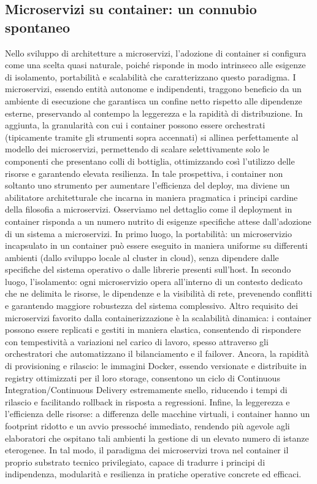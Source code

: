 \subsection{Microservizi su container: un connubio spontaneo}
Nello sviluppo di architetture a microservizi, l’adozione di container si configura come una scelta quasi naturale, poiché risponde in modo intrinseco alle esigenze di isolamento, portabilità e scalabilità che caratterizzano questo paradigma. I microservizi, essendo entità autonome e indipendenti, traggono beneficio da un ambiente di esecuzione che garantisca un confine netto rispetto alle dipendenze esterne, preservando al contempo la leggerezza e la rapidità di distribuzione. In aggiunta, la granularità con cui i container possono essere orchestrati (tipicamente tramite gli strumenti sopra accennati) si allinea perfettamente al modello dei microservizi, permettendo di scalare selettivamente solo le componenti che presentano colli di bottiglia, ottimizzando così l’utilizzo delle risorse e garantendo elevata resilienza. In tale prospettiva, i container non soltanto uno strumento per aumentare l'efficienza del deploy, ma diviene un abilitatore architetturale che incarna in maniera pragmatica i principi cardine della filosofia a microservizi.
Osserviamo nel dettaglio come il deployment in container risponda a un numero nutrito di esigenze specifiche attese dall'adozione di un sistema a microservizi.
In primo luogo, la portabilità: un microservizio incapsulato in un container può essere eseguito in maniera uniforme su differenti ambienti (dallo sviluppo locale al cluster in cloud), senza dipendere dalle specifiche del sistema operativo o dalle librerie presenti sull’host. In secondo luogo, l’isolamento: ogni microservizio opera all’interno di un contesto dedicato che ne delimita le risorse, le dipendenze e la visibilità di rete, prevenendo conflitti e garantendo maggiore robustezza del sistema complessivo. Altro requisito dei microservizi favorito dalla containerizzazione è la scalabilità dinamica: i container possono essere replicati e gestiti in maniera elastica, consentendo di rispondere con tempestività a variazioni nel carico di lavoro, spesso attraverso gli orchestratori che automatizzano il bilanciamento e il failover. Ancora, la rapidità di provisioning e rilascio: le immagini Docker, essendo versionate e distribuite in registry ottimizzati per il loro storage, consentono un ciclo di Continuous Integration/Continuous Delivery estremamente snello, riducendo i tempi di rilascio e facilitando rollback in risposta a regressioni. Infine, la leggerezza e l’efficienza delle risorse: a differenza delle macchine virtuali, i container hanno un footprint ridotto e un avvio pressoché immediato, rendendo più agevole agli elaboratori che ospitano tali ambienti la gestione di un elevato numero di istanze eterogenee. In tal modo, il paradigma dei microservizi trova nel container il proprio substrato tecnico privilegiato, capace di tradurre i principi di indipendenza, modularità e resilienza in pratiche operative concrete ed efficaci.


